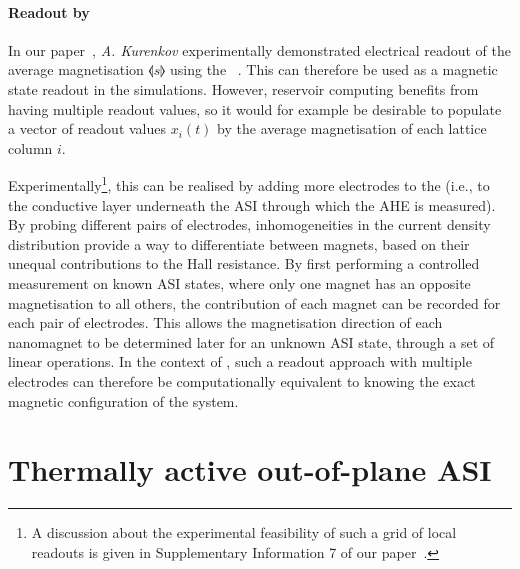 \paragraph{Readout by }
In our paper~\cite{KUR-24}, \textit{A. Kurenkov} experimentally demonstrated electrical readout of the average magnetisation $\llangle s \rrangle$ using the ~\cite{AHE}.
This can therefore be used as a magnetic state readout in the simulations.
However, reservoir computing benefits from having multiple readout values, so it would for example be desirable to populate a vector of readout values $x_i(t)$ by the average magnetisation of each lattice column $i$. \par %
Experimentally\footnote{
	A discussion about the experimental feasibility of such a grid of local readouts is given in Supplementary Information 7 of our paper~\cite{KUR-24}.
}, this can be realised by adding more electrodes to the  (i.e., to the conductive layer underneath the ASI through which the AHE is measured).
By probing different pairs of electrodes, inhomogeneities in the current density distribution provide a way to differentiate between magnets, based on their unequal contributions to the Hall resistance.
By first performing a controlled measurement on known ASI states, where only one magnet has an opposite magnetisation to all others, the contribution of each magnet can be recorded for each pair of electrodes.
This allows the magnetisation direction of each nanomagnet to be determined later for an unknown ASI state, through a set of linear operations. %
In the context of , such a readout approach with multiple electrodes can therefore be computationally equivalent to knowing the exact magnetic configuration of the system.

\section{Thermally active out-of-plane ASI}
